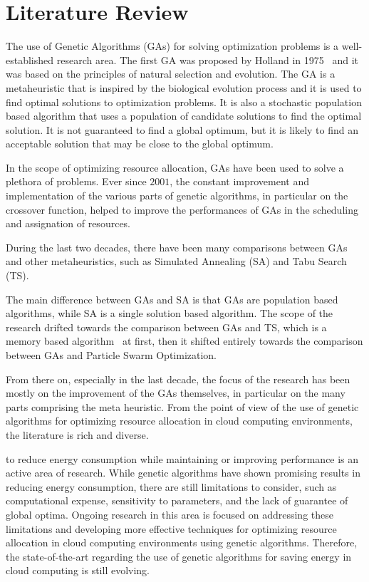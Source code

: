 \section{Literature Review}\label{sect:litreview}

The use of Genetic Algorithms (GAs) for solving optimization problems is a well-established research area.
The first GA was proposed by Holland in 1975~\cite{holland1975adaptation} and it was based on the principles of natural selection and evolution.
The GA is a metaheuristic that is inspired by the biological evolution process and it is used to find optimal solutions to optimization problems.
It is also a stochastic population based algorithm that uses a population of candidate solutions to find the optimal solution. It is not guaranteed
to find a global optimum, but it is likely to find an acceptable solution that may be close to the global optimum.~\cite{alba2008introduction}

In the scope of optimizing resource allocation, GAs have been used to solve a plethora of problems. Ever since $2001$, the constant improvement and implementation
of the various parts of genetic algorithms, in particular on the crossover function, helped to improve the performances of GAs in the scheduling and
assignation of resources.~\cite{alcaraz2001robust}

During the last two decades, there have been many comparisons between GAs and other metaheuristics, such as Simulated Annealing (SA) and Tabu Search (TS).

The main difference between GAs and SA is that GAs are population based algorithms, while SA is a single solution based algorithm. The scope of the research
drifted towards the comparison between GAs and TS, which is a memory based algorithm~\cite{zolfaghari2002comparative} at first, then it shifted entirely
towards the comparison between GAs and Particle Swarm Optimization.~\cite{hassan2005comparison}

From there on, especially in the last decade, the focus of the research has been mostly on the improvement of the GAs themselves, in particular on the many parts comprising
the meta heuristic. 
From the point of view of the use of genetic algorithms for optimizing resource allocation in cloud computing environments,
the literature is rich and diverse.




to reduce energy consumption while maintaining or improving performance is an active area of research. 
While genetic algorithms have shown promising results in reducing energy consumption, there are still limitations to consider, 
such as computational expense, sensitivity to parameters, and the lack of guarantee of global optima. 
Ongoing research in this area is focused on addressing these limitations and developing more effective techniques 
for optimizing resource allocation in cloud computing environments using genetic algorithms. 
Therefore, the state-of-the-art regarding the use of genetic algorithms for saving energy in cloud computing is still evolving.